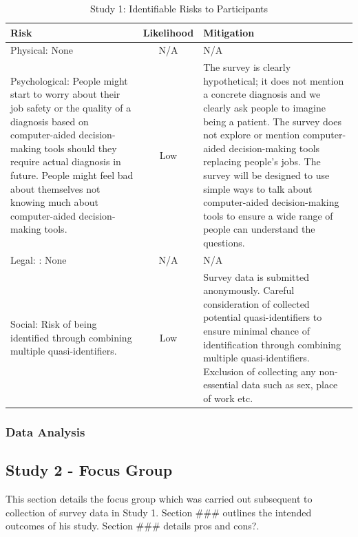 \documentclass[manuscript,screen,review]{acmart}
\begin{document}
\begin{table}[h]
\begin{center}
\begin{tabular}{ | p{6cm} | c | p{6cm} |}
\hline
 Risk & Likelihood & Mitigation \\
 \hline
 \hline
 Physical: None & N/A & N/A \\
 \hline
 Psychological: People might start to worry about their job safety or the quality of a diagnosis based on computer-aided decision-making tools should they require actual diagnosis in future. People might feel bad about themselves not knowing much about computer-aided decision-making tools. & Low & The survey is clearly hypothetical; it does not mention a concrete diagnosis and we clearly ask people to imagine being a patient. The survey does not explore or mention computer-aided decision-making tools replacing people's jobs. The survey will be designed to use simple ways to talk about computer-aided decision-making tools to ensure a wide range of people can understand the questions. \\
 \hline
 Legal: : None & N/A & N/A \\
 \hline
Social: Risk of being identified through combining multiple quasi-identifiers. & Low & Survey data is submitted anonymously. Careful consideration of collected potential quasi-identifiers to ensure minimal chance of identification through combining multiple quasi-identifiers. Exclusion of collecting any non-essential data such as sex, place of work etc.\\
\hline
\end{tabular}
\caption{Study 1: Identifiable Risks to Participants}
\label{table:study1_risks}
\end{center}
\end{table}






\subsubsection{Data Analysis}

\subsection{Study 2 - Focus Group}

This section details the focus group which was carried out subsequent to collection of survey data in Study 1. Section ### outlines the intended outcomes of his study. Section ### details pros and cons?.
\end{document}
